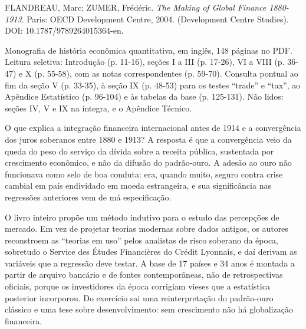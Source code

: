 
\begin{identificacao}
FLANDREAU, Marc; ZUMER, Frédéric. \emph{The Making of Global Finance
1880-1913}. Paris: OECD Development Centre, 2004. (Development Centre
Studies). DOI: 10.1787/9789264015364-en.

Monografia de história econômica quantitativa, em inglês, 148 páginas no PDF.
Leitura seletiva: Introdução (p. 11-16), seções I a III (p. 17-26), VI a VIII
(p. 36-47) e X (p. 55-58), com as notas correspondentes (p. 59-70). Consulta
pontual ao fim da seção V (p. 33-35), à seção IX (p. 48-53) para os testes
``trade'' e ``tax'', ao Apêndice Estatístico (p. 96-104) e às tabelas da base
(p. 125-131). Não lidos: seções IV, V e IX na íntegra, e o Apêndice Técnico.
\end{identificacao}

O que explica a integração financeira internacional antes de 1914 e a
convergência dos juros soberanos entre 1880 e 1913? A resposta é que a
convergência veio da queda do peso do serviço da dívida sobre a receita
pública, sustentada por crescimento econômico, e não da difusão do padrão-ouro.
A adesão ao ouro não funcionava como selo de boa conduta: era, quando muito,
seguro contra crise cambial em país endividado em moeda estrangeira, e sua
significância nas regressões anteriores vem de má especificação.

O livro inteiro propõe um método indutivo para o estudo das percepções de
mercado. Em vez de projetar teorias modernas sobre dados antigos, os autores
reconstroem as ``teorias em uso'' pelos analistas de risco soberano da época,
sobretudo o Service des Études Financières do Crédit Lyonnais, e daí derivam as
variáveis que a regressão deve testar. A base de 17 países e 34 anos é montada
a partir de arquivo bancário e de fontes contemporâneas, não de retrospectivas
oficiais, porque os investidores da época corrigiam vieses que a estatística
posterior incorporou. Do exercício sai uma reinterpretação do padrão-ouro
clássico e uma tese sobre desenvolvimento: sem crescimento não há globalização
financeira.

